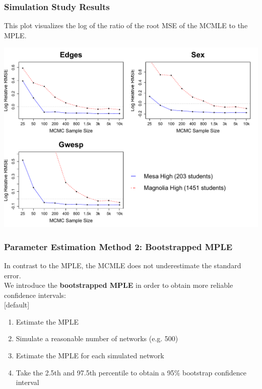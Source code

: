 \documentclass[xcolor=dvipsnames]{beamer}
\begin{document}
\begin{frame}
\frametitle{Simulation Study Results}
This plot visualizes the log of the ratio of the root MSE of the MCMLE to the MPLE.
\begin{center}
\includegraphics[scale=.34]{RMSE_presentation} 
\end{center}
\end{frame}

\begin{frame}
\frametitle{Parameter Estimation Method 2: Bootstrapped MPLE}
In contrast to the MPLE, the MCMLE does not underestimate the standard error.\\[0.4cm]
We introduce the \textbf{bootstrapped MPLE} in order to obtain more reliable confidence intervals:\\
[default]
\begin{enumerate}
\item Estimate the MPLE\\[0.2cm]
\item Simulate a reasonable number of networks (e.g. 500)\\[0.2cm]
\item Estimate the MPLE for each simulated network\\[0.2cm]
\item Take the 2.5th and 97.5th percentile to obtain a 95\% bootstrap confidence interval\\[0.2cm]
\end{enumerate}
\end{frame}
\end{document}
